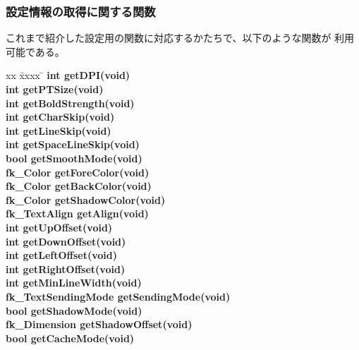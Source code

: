 \subsubsection{設定情報の取得に関する関数}
これまで紹介した設定用の関数に対応するかたちで、以下のような関数が
利用可能である。
\begin{tabbing}
xx \= xxxx \= \kill
\> \textbf{int getDPI(void)} \\
\> \textbf{int getPTSize(void)} \\
\> \textbf{int getBoldStrength(void)} \\
\> \textbf{int getCharSkip(void)} \\
\> \textbf{int getLineSkip(void)} \\
\> \textbf{int getSpaceLineSkip(void)} \\
\> \textbf{bool getSmoothMode(void)} \\
\> \textbf{fk\_Color getForeColor(void)} \\
\> \textbf{fk\_Color getBackColor(void)} \\
\> \textbf{fk\_Color getShadowColor(void)} \\
\> \textbf{fk\_TextAlign getAlign(void)} \\
\> \textbf{int getUpOffset(void)} \\
\> \textbf{int getDownOffset(void)} \\
\> \textbf{int getLeftOffset(void)} \\
\> \textbf{int getRightOffset(void)} \\
\> \textbf{int getMinLineWidth(void)} \\
\> \textbf{fk\_TextSendingMode getSendingMode(void)} \\
\> \textbf{bool getShadowMode(void)} \\
\> \textbf{fk\_Dimension getShadowOffset(void)} \\
\> \textbf{bool getCacheMode(void)} \\
\end{tabbing}

